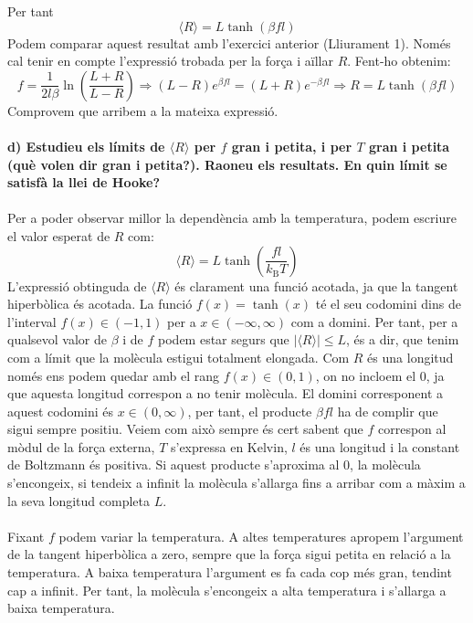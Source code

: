 \documentclass[12pt,twosides,onecolumn,openany]{article}
\begin{document}
Per tant
\begin{equation*}
    \boxed{
        \langle R \rangle = L \tanh{(\beta fl)}
    }
\end{equation*}
Podem comparar aquest resultat amb l'exercici anterior (Lliurament 1). Només cal tenir en compte l'expressió trobada per la força i aïllar $R$. Fent-ho obtenim:
\begin{equation*}
    f = \frac{1}{2l\beta} \ln{\left(\frac{L+R}{L-R}\right)} \Rightarrow (L-R)e^{\beta fl} = (L + R)e^{-\beta fl} \Rightarrow R = L \tanh{(\beta fl)}
\end{equation*}
Comprovem que arribem a la mateixa expressió.\\\\
\textbf{d) Estudieu els límits de $\langle R \rangle$ per $f$ gran i petita, i per $T$ gran i petita (què volen dir gran i petita?). Raoneu els resultats. En quin límit se satisfà la llei de Hooke?}\\\\
Per a poder observar millor la dependència amb la temperatura, podem escriure el valor esperat de $R$ com:
\begin{equation*}
    \langle R \rangle = L \tanh{\left( \frac{fl}{k_{\text{B}}T} \right)}
\end{equation*}
L'expressió obtinguda de $\langle R \rangle$ és clarament una funció acotada, ja que la tangent hiperbòlica és acotada. La funció $f(x) = \tanh{(x)}$ té el seu codomini dins de l'interval $f(x) \in (-1,1)$ per a $x\in (-\infty,\infty)$ com a domini. Per tant, per a qualsevol valor de $\beta$ i de $f$ podem estar segurs que $\left| {\langle R \rangle}\right| \leq L$, és a dir, que tenim com a límit que la molècula estigui totalment elongada. Com $R$ és una longitud només ens podem quedar amb el rang $f(x) \in (0,1)$, on no incloem el 0, ja que aquesta longitud correspon a no tenir molècula. El domini corresponent a aquest codomini és $x\in (0,\infty)$, per tant, el producte $\beta f l$ ha de complir que sigui sempre positiu. Veiem com això sempre és cert sabent que $f$ correspon al mòdul de la força externa, $T$ s'expressa en Kelvin, $l$ és una longitud i la constant de Boltzmann és positiva. Si aquest producte s'aproxima al 0, la molècula s'encongeix, si tendeix a infinit la molècula s'allarga fins a arribar com a màxim a la seva longitud completa $L$.\\\\
Fixant $f$ podem variar la temperatura. A altes temperatures apropem l'argument de la tangent hiperbòlica a zero, sempre que la força sigui petita en relació a la temperatura. A baixa temperatura l'argument es fa cada cop més gran, tendint cap a infinit. Per tant, la molècula s'encongeix a alta temperatura i s'allarga a baixa temperatura.\\\\
\end{document}
